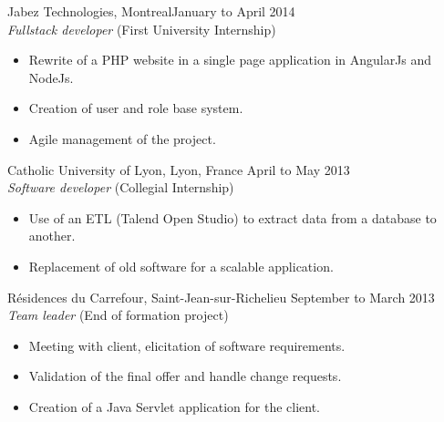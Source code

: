 \documentclass{res}
\newcommand{\inFrench}[1]{}
\newcommand{\inEnglish}[1]{#1}
\begin{document}
\begin{resume}
{	%
	Jabez Technologies, Montreal\footnotemark[\value{footnote}]
	\hfill January to April 2014 \\
	{\sl Fullstack developer} \hfill (First University Internship)
	\vspace{0.05in}

	\begin{itemize} \itemsep -2pt
		\item Rewrite of a PHP website in a single page application in AngularJs and NodeJs.
		\item Creation of user and role base system.
		\item Agile management of the project.
	\end{itemize}

	Catholic University of Lyon, Lyon, France
	\hfill April to May 2013 \\
	{\sl Software developer} \hfill (Collegial Internship)
	\vspace{0.05in}

	\begin{itemize} \itemsep -2pt
		\item Use of an ETL (Talend Open Studio) to extract data from a database to another.
		\item Replacement of old software for a scalable application.
	\end{itemize}

	Résidences du Carrefour, Saint-Jean-sur-Richelieu
	\hfill September to March 2013 \\
	{\sl Team leader} \hfill (End of formation project)
	\vspace{0.05in}

	\begin{itemize} \itemsep -2pt
		\item Meeting with client, elicitation of software requirements.
		\item Validation of the final offer and handle change requests.
		\item Creation of a Java Servlet application for the client.
	\end{itemize}

}

\newpage

\inFrench{
	\section{Connaissances informatiques}
}
\inEnglish{
}
\end{resume}
\end{document}
